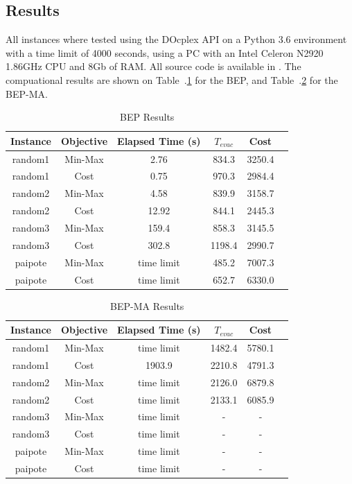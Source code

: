\documentclass[conference]{IEEEtran}
\begin{document}
\subsection{Results}
 All instances where tested using the DOcplex API on a Python 3.6 environment with a time limit of 4000 seconds, using a PC with an Intel Celeron N2920 1.86GHz CPU and 8Gb of RAM. All source code is available in \cite{b5}. The compuational results are shown on Table~.\ref{table:res1} for the BEP, and Table~.\ref{table:res2} for the BEP-MA. 
\begin{table}[htbp]

\caption{BEP Results}
\begin{center}
\begin{tabular}{ cccccc } 
\hline
Instance & Objective & Elapsed Time (s) & $T_{evac}$ & Cost\\ 
\hline
random1 & Min-Max & 2.76 & 834.3 & 3250.4\\
random1 & Cost & 0.75 & 970.3 & 2984.4\\
random2 & Min-Max & 4.58 & 839.9 & 3158.7\\
random2 & Cost & 12.92 & 844.1  & 2445.3\\
random3 & Min-Max & 159.4 & 858.3 & 3145.5\\
random3 & Cost & 302.8 & 1198.4  & 2990.7\\
paipote & Min-Max & time limit & 485.2 & 7007.3\\
paipote & Cost & time limit & 652.7 & 6330.0  \\
\hline
\end{tabular}
\end{center}
\label{table:res1}
\end{table}
\begin{table}[htbp]
\caption{BEP-MA Results}
\begin{center}
\begin{tabular}{ cccccc } 
\hline
Instance & Objective & Elapsed Time (s) & $T_{evac}$ & Cost\\ 
\hline
random1 & Min-Max & time limit & 1482.4 & 5780.1\\
random1 & Cost & 1903.9 & 2210.8 & 4791.3\\
random2 & Min-Max & time limit & 2126.0 & 6879.8\\
random2 & Cost & time limit & 2133.1 & 6085.9\\
random3 & Min-Max & time limit & - & - \\
random3 & Cost & time limit & - & - \\
paipote & Min-Max & time limit & - & - \\
paipote & Cost & time limit & - & - \\
\hline
\end{tabular}
\end{center}
\label{table:res2}
\end{table}
\end{document}
